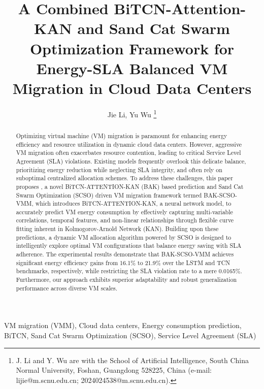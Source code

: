 \documentclass[conference]{{IEEEtran}}
\title{A Combined BiTCN-Attention-KAN and Sand Cat Swarm Optimization Framework for Energy-SLA Balanced VM Migration in Cloud Data Centers
}
\author{Jie Li, Yu Wu
\thanks{
        J. Li and Y. Wu are with the School of Artificial Intelligence, South China Normal University, Foshan, Guangdong 528225, China (e-mail: lijie@m.scnu.edu.cn; 2024024538@m.scnu.edu.cn).
    }
}
\begin{document}
\maketitle

\begin{abstract}
Optimizing virtual machine (VM) migration is paramount for enhancing energy efficiency and resource utilization in dynamic cloud data centers. However, aggressive VM migration often exacerbates resource contention, leading to critical Service Level Agreement (SLA) violations. Existing models frequently overlook this delicate balance, prioritizing energy reduction while neglecting SLA integrity, and often rely on suboptimal centralized allocation schemes. To address these challenges, this paper proposes , a novel BiTCN-ATTENTION-KAN (BAK) based prediction and Sand Cat Swarm Optimization (SCSO) driven VM migration framework termed BAK-SCSO-VMM, which introduces BiTCN-ATTENTION-KAN, a  neural network model, to accurately predict VM energy consumption by effectively capturing multi-variable correlations, temporal features, and non-linear relationships through flexible curve fitting inherent in Kolmogorov-Arnold Network (KAN). Building upon these predictions, a dynamic VM allocation algorithm powered by SCSO is designed to intelligently explore optimal VM configurations that balance energy saving with SLA adherence. The experimental results demonstrate that BAK-SCSO-VMM achieves significant energy efficiency gains from 16.1\%  to 21.9\% over the LSTM and TCN benchmarks, respectively, while restricting the SLA violation rate to a mere 0.0165\%. Furthermore, our approach exhibits superior adaptability and robust generalization performance across diverse VM scales.

\end{abstract}

  \begin{IEEEkeywords}
    VM migration (VMM), Cloud data centers, Energy consumption prediction, BiTCN, Sand Cat Swarm Optimization (SCSO), Service Level Agreement (SLA)
  \end{IEEEkeywords}

%
\IEEEpeerreviewmaketitle
\end{document}
